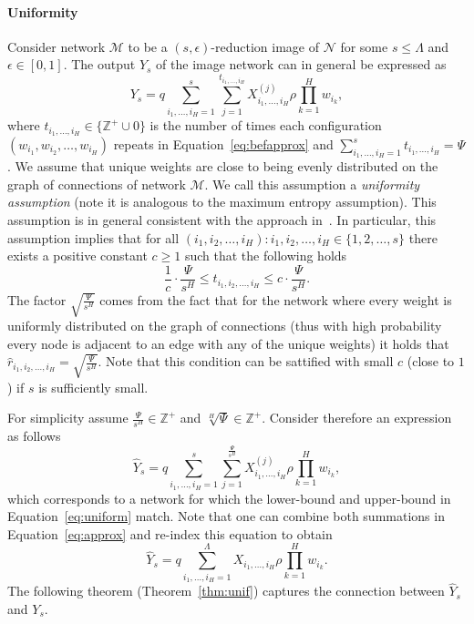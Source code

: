 \documentclass[twoside]{article}
\begin{document}
\paragraph{Uniformity}
Consider network $\mathcal{M}$ to be a $(s,\epsilon)$-reduction image of $\mathcal{N}$ for some $s \leq \Lambda$ and $\epsilon \in [0,1]$. The output $Y_s$ of the image network can in general be expressed as
\[Y_s = q\sum_{i_1,\dots,i_H=1}^{s}\sum_{j=1}^{t_{i_1,\dots,i_H}}X_{i_1,\dots,i_H}^{(j)}\rho\prod_{k = 1}^{H}w_{i_k},
\]
where $t_{i_1,\dots,i_H} \in \{\mathbb{Z}^{+}\cup{0}\}$ is the number of times each configuration $(w_{i_1},w_{i_2},\dots,w_{i_H})$ repeats in Equation~\ref{eq:befapprox} and $\sum_{i_1,\dots,i_H=1}^{s}t_{i_1,\dots,i_H} = \Psi$. We assume that unique weights are close to being evenly distributed on the graph of connections of network $\mathcal{M}$. We call this assumption a \textit{uniformity assumption} (note it is analogous to the maximum entropy assumption). This assumption is in general consistent with the approach in~\cite{NIPS2013_5025}. In particular, this assumption implies that for all $(i_1,i_2,\dots,i_H):i_1,i_2,\dots,i_H \in \{1,2,\dots,s\}$ there exists a positive constant $c \geq 1$ such that the following holds
\begin{equation}
\frac{1}{c}\cdot\frac{\Psi}{s^H} \leq t_{i_1,i_2,\dots,i_H} \leq c\cdot\frac{\Psi}{s^H}.
\label{eq:uniform}
\end{equation}
The factor $\sqrt{\frac{\Psi}{s^H}}$ comes from the fact that for the network where every weight is uniformly distributed on the graph of connections (thus with high probability every node is adjacent to an edge with any of the unique weights) it holds that $\hat{r}_{i_1,i_2,\dots,i_H} = \sqrt{\frac{\Psi}{s^H}}$. Note that this condition can be sattified with small $c$ (close to $1$) if $s$ is sufficiently small.

For simplicity assume $\frac{\Psi}{s^H} \in \mathbb{Z}^{+}$ and $\sqrt[H]{\Psi} \in \mathbb{Z}^{+}$. Consider therefore an expression as follows
\begin{equation}
\hat{Y}_s = q\sum_{i_1,\dots,i_H=1}^{s}\sum_{j=1}^{\frac{\Psi}{s^H}}X_{i_1,\dots,i_H}^{(j)}\rho\prod_{k = 1}^{H}w_{i_k},
\label{eq:approx}
\end{equation}
which corresponds to a network for which the lower-bound and upper-bound in Equation~\ref{eq:uniform} match. Note that one can combine both summations in Equation~\ref{eq:approx} and re-index this equation to obtain
\begin{equation}
\hat{Y}_s = q\sum_{i_1,\dots,i_H=1}^{\Lambda}X_{i_1,\dots,i_H}\rho\prod_{k = 1}^{H}w_{i_k}.
\label{eq:approxfinal}
\end{equation}
The following theorem (Theorem~\ref{thm:unif}) captures the connection between $\hat{Y}_s$ and $Y_{s}$.
\end{document}
